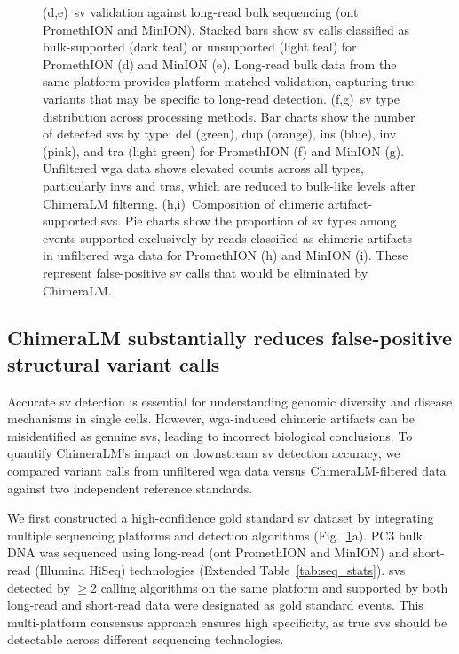\documentclass[pdflatex,sn-nature,lineno]{sn-jnl}%
\theoremstyle{thmstyleone}%
\theoremstyle{thmstyletwo}%
\theoremstyle{thmstylethree}%
\begin{document}
\begin{figure}[H]
{		(d,e)~\gls{sv} validation against long-read bulk sequencing (\gls{ont} PromethION and MinION). Stacked bars show \gls{sv} calls classified as bulk-supported (dark teal) or unsupported (light teal) for PromethION (d) and MinION (e). Long-read bulk data from the same platform provides platform-matched validation, capturing true variants that may be specific to long-read detection.
		(f,g)~\gls{sv} type distribution across processing methods. Bar charts show the number of detected \glspl{sv} by type: \gls{del} (green), \gls{dup} (orange), \gls{ins} (blue), \gls{inv} (pink), and \gls{tra} (light green) for PromethION (f) and MinION (g). Unfiltered \gls{wga} data shows elevated counts across all types, particularly \glspl{inv} and \glspl{tra}, which are reduced to bulk-like levels after ChimeraLM filtering.
		(h,i)~Composition of chimeric artifact-supported \glspl{sv}. Pie charts show the proportion of \gls{sv} types among events supported exclusively by reads classified as chimeric artifacts in unfiltered \gls{wga} data for PromethION (h) and MinION (i). These represent false-positive \gls{sv} calls that would be eliminated by ChimeraLM.
	}\label{fig:figure3}
\end{figure}

\subsection*{ChimeraLM substantially reduces false-positive structural variant calls}

Accurate \gls{sv} detection is essential for understanding genomic diversity and disease mechanisms in single cells.
However, \gls{wga}-induced chimeric artifacts can be misidentified as genuine \glspl{sv}, leading to incorrect biological conclusions.
To quantify ChimeraLM's impact on downstream \gls{sv} detection accuracy, we compared variant calls from unfiltered \gls{wga} data versus ChimeraLM-filtered data against two independent reference standards.

We first constructed a high-confidence gold standard \gls{sv} dataset by integrating multiple sequencing platforms and detection algorithms (Fig.~\ref{fig:figure3}a).
PC3 bulk DNA was sequenced using long-read (\gls{ont} PromethION and MinION) and short-read (Illumina HiSeq) technologies (Extended Table~\ref{tab:seq_stats}).
\glspl{sv} detected by $\geq$2 calling algorithms on the same platform and supported by both long-read and short-read data were designated as gold standard events.
This multi-platform consensus approach ensures high specificity, as true \glspl{sv} should be detectable across different sequencing technologies.
\end{document}
